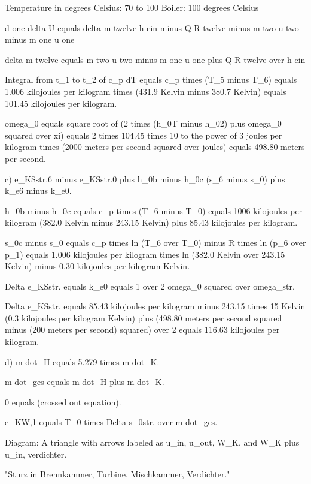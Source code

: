 Temperature in degrees Celsius: 70 to 100
Boiler: 100 degrees Celsius

d one
delta U equals delta m twelve h ein minus Q R twelve minus m two u two minus m one u one

delta m twelve equals m two u two minus m one u one plus Q R twelve over h ein

Integral from t_1 to t_2 of c_p dT equals c_p times (T_5 minus T_6) equals 1.006 kilojoules per kilogram times (431.9 Kelvin minus 380.7 Kelvin) equals 101.45 kilojoules per kilogram.

omega_0 equals square root of (2 times (h_0T minus h_02) plus omega_0 squared over xi) equals 2 times 104.45 times 10 to the power of 3 joules per kilogram times (2000 meters per second squared over joules) equals 498.80 meters per second.

c) e_KSstr.6 minus e_KSstr.0 plus h_0b minus h_0c (s_6 minus s_0) plus k_e6 minus k_e0.

h_0b minus h_0c equals c_p times (T_6 minus T_0) equals 1006 kilojoules per kilogram (382.0 Kelvin minus 243.15 Kelvin) plus 85.43 kilojoules per kilogram.

s_0c minus s_0 equals c_p times ln (T_6 over T_0) minus R times ln (p_6 over p_1) equals 1.006 kilojoules per kilogram times ln (382.0 Kelvin over 243.15 Kelvin) minus 0.30 kilojoules per kilogram Kelvin.

Delta e_KSstr. equals k_e0 equals 1 over 2 omega_0 squared over omega_str.

Delta e_KSstr. equals 85.43 kilojoules per kilogram minus 243.15 times 15 Kelvin (0.3 kilojoules per kilogram Kelvin) plus (498.80 meters per second squared minus (200 meters per second) squared) over 2 equals 116.63 kilojoules per kilogram.

d) m dot_H equals 5.279 times m dot_K.

m dot_ges equals m dot_H plus m dot_K.

0 equals (crossed out equation).

e_KW,1 equals T_0 times Delta s_0str. over m dot_ges.

Diagram: A triangle with arrows labeled as u_in, u_out, W_K, and W_K plus u_in, verdichter.

"Sturz in Brennkammer, Turbine, Mischkammer, Verdichter."